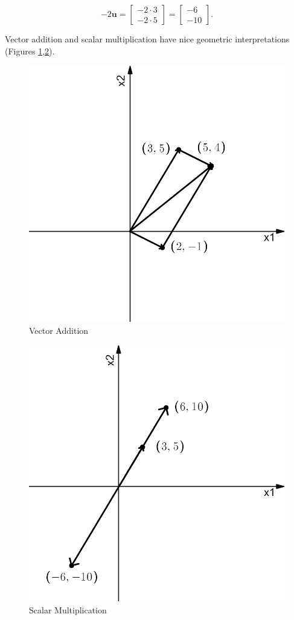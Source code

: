 \documentclass[
]{book}
\theoremstyle{definition}
\theoremstyle{definition}
\theoremstyle{definition}
\theoremstyle{definition}
\theoremstyle{remark}
\begin{document}
\[-2\mathbf{u}=\begin{bmatrix}-2\cdot 3\\-2\cdot 5\end{bmatrix}=\begin{bmatrix}-6\\-10\end{bmatrix}.\]

Vector addition and scalar multiplication have nice geometric interpretations (Figures \ref{fig:vecadd},\ref{fig:scmult}).

\begin{figure}

{\centering \includegraphics[width=0.5\linewidth]{images/vg2} 

}

\caption{Vector Addition}\label{fig:vecadd}
\end{figure}

\begin{figure}

{\centering \includegraphics[width=0.5\linewidth]{images/vg3} 

}

\caption{Scalar Multiplication}\label{fig:scmult}
\end{figure}
\end{document}

